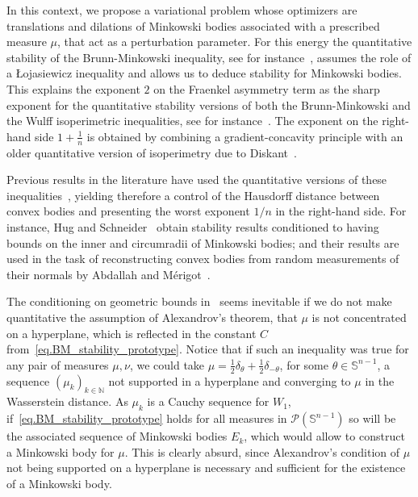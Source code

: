 \documentclass[a4paper, 10pt, twoside]{amsart}
\numberwithin{equation}{section}
\theoremstyle{plain}
\theoremstyle{definition}
\begin{document}
In this context, we propose a variational problem whose optimizers are translations and dilations of Minkowski bodies associated with a prescribed measure $\mu$, that act as a perturbation parameter. For this energy the quantitative stability of the Brunn-Minkowski inequality, see for instance~\cite{figalli2009refined,figalli2017quantitative,figalli2024sharp}, assumes the role of a Łojasiewicz inequality and allows us to deduce stability for Minkowski bodies. This explains the exponent $2$ on the Fraenkel asymmetry term as the sharp exponent for the quantitative stability versions of both the Brunn-Minkowski and the Wulff isoperimetric inequalities, see for instance~\cite{fusco2008sharp,figalli2010stability,figalli2017quantitative}. The exponent on the right-hand side $1 + \frac{1}{n}$ is obtained by combining a gradient-concavity principle with an older quantitative version of isoperimetry due to Diskant~\cite{diskant1972bounds}. 

Previous results in the literature have used the quantitative versions of these inequalities~\cite{diskant1972bounds}, yielding therefore a control of the Hausdorff distance between convex bodies and presenting the worst exponent $1/n$ in the right-hand side. For instance, Hug and Schneider~\cite{hug2002stability} obtain stability results conditioned to having bounds on the inner and circumradii of Minkowski bodies; and their results are used in the task of reconstructing convex bodies from random measurements of their normals by Abdallah and Mérigot~\cite{abdallah2015reconstruction}. 

The conditioning on geometric bounds in~\cite{hug2002stability} seems inevitable if we do not make quantitative the assumption of Alexandrov's theorem, that $\mu$ is not concentrated on a hyperplane, which is reflected in the constant $C$ from~\eqref{eq.BM_stability_prototype}. Notice that if such an inequality was true for any pair of measures $\mu,\nu$, we could take $\mu = \frac{1}{2}\delta_\theta + \frac{1}{2}\delta_{-\theta}$, for some $\theta \in {\mathbb{S}}^{n-1}$, a sequence ${\left(\mu_k\right)}_{k \in \mathbb{N}}$ not supported in a hyperplane and converging to $\mu$ in the Wasserstein distance. As $\mu_k$ is a Cauchy sequence for $W_1$, if~\eqref{eq.BM_stability_prototype} holds for all measures in $\mathscr{P}(\mathbb{S}^{n-1})$ so will be the associated sequence of Minkowski bodies $E_k$, which would allow to construct a Minkowski body for $\mu$. This is clearly absurd, since Alexandrov's condition of $\mu$ not being supported on a hyperplane is necessary and sufficient for the existence of a Minkowski body.
\end{document}
